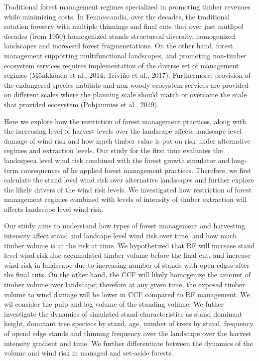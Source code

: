 \documentclass[]{elsarticle} %
\begin{document}
Traditional forest management regimes specialized in promoting timber revenues while minimizing costs. In Fennoscandia, over the decades, the traditional rotation forestry with multiple thinnings and final cuts that over just mutlipel decades (from 1950) homogenized stands structureal diversity, homogenized landscapes and increased forest fragmenetations. On the other hand, forest management supporting multifunctional landscapes, and promoting non-timber ecosystem services requires implementation of the diverse set of management regimes (Mönkkönen et al., 2014; Triviño et al., 2017). Furthermore, provision of the endangered species habitats and non-woody ecosystem services are provided on different scales where the planning scale should match or overcome the scale that provided ecosystem (Pohjanmies et al., 2019).

Here we explore how the restriction of forest management practices, along with the increasing level of harvest levels over the landscape affects landscape level damage of wind risk and how much timber value is put on risk under alternative regimes and extraction levels. Our study for the first time evaluates the landcspeca level wind risk combined with the forest growth simulator and long-term consequences of he applied forest management practices. Therefore, we first calculate the stand level wind risk over alternative landscapes and further explore the likely drivers of the wind risk levels. We investigated how restriction of forest management regimes combined with levels of intensity of timber extraction will affects landscape level wind risk.

Our study aims to understand how types of forest management and harvesting intensity affect stand and landcape level wind risk over time, and how much timber volume is at the risk at time. We hypothetized that RF will increase stand level wind risk due accumulated timber volume before the final cut, and increase wind risk in landscape due to increasing number of stands with open edges after the final cuts. On the other hand, the CCF will likely homogenize the amount of timber volume over landscape; therefore at any given time, the exposed timber volume to wind damage will be lower in CCF compared to RF management. We wil consider the pulp and log volume of the standing volume. We futher investigate the dynamics of simulated stand characteristics as stand dominant height, dominant tree speciecs by stand, age, number of trees by stand, frequency of opend edge stands and thinning frequency over the landscape over the harvest intensity gradient and time. We further differentiate between the dynamics of the volume and wind risk in managed and set-aside forests.
\end{document}
